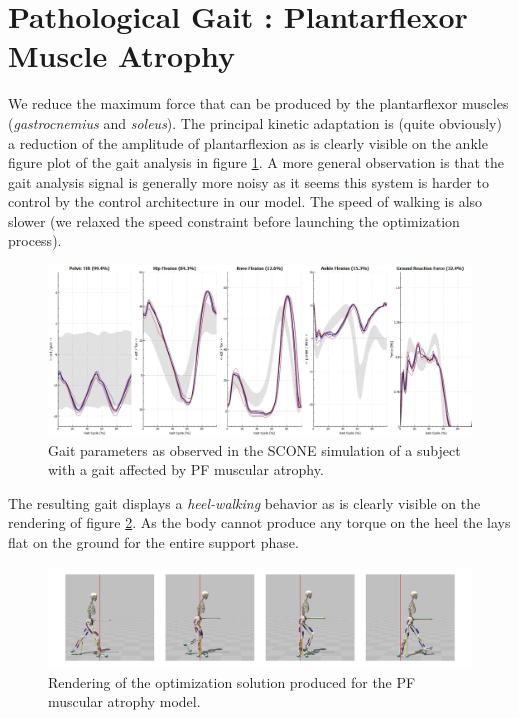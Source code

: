 \documentclass[11pt]{article}
\begin{document}
\section{Pathological Gait : Plantarflexor Muscle Atrophy}

We reduce the maximum force that can be produced by the plantarflexor muscles (\textit{gastrocnemius} and \textit{soleus}). The principal kinetic adaptation is (quite obviously) a reduction of the amplitude of plantarflexion as is clearly visible on the ankle figure plot of the gait analysis in figure \ref{atrophic_gait}. A more general observation is that the gait analysis signal is generally more noisy as it seems this system is harder to control by the control architecture in our model. The speed of walking is also slower (we relaxed the speed constraint before launching the optimization process).

\begin{figure}[h!]
    \centering
    \includegraphics[width=\textwidth]{screens/atrophy_gait.png}
    \caption{Gait parameters as observed in the SCONE simulation of a subject with a gait affected by PF muscular atrophy.}
    \label{atrophic_gait}
\end{figure}

The resulting gait displays a \textit{heel-walking} behavior as is clearly visible on the rendering of figure \ref{atrophic_render}. As the body cannot produce any torque on the heel the lays flat on the ground for the entire support phase.

\begin{figure}[h!]
    \centering
    \includegraphics[width=\textwidth]{screens/heel_walk.jpg}
    \caption{Rendering of the optimization solution produced for the PF muscular atrophy model.}
    \label{atrophic_render}
\end{figure}
\end{document}

